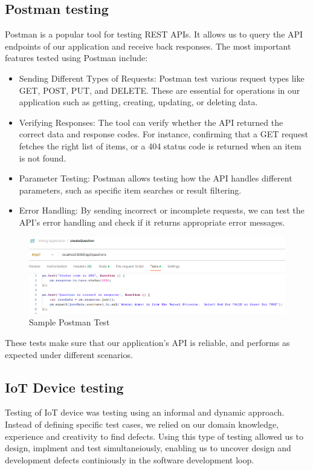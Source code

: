\subsection{Postman testing}
Postman is a popular tool for testing REST APIs. It allows us to query the API endpoints of our application and receive back responses. The most important features tested using Postman include:

\begin{itemize}
    \item {Sending Different Types of Requests}: Postman test various request types like GET, POST, PUT, and DELETE. These are essential for operations in our application such as getting, creating, updating, or deleting data.
    \item {Verifying Responses}: The tool can verify whether the API returned the correct data and response codes. For instance, confirming that a GET request fetches the right list of items, or a 404 status code is returned when an item is not found.
    \item {Parameter Testing}: Postman allows testing how the API handles different parameters, such as specific item searches or result filtering.
    \item {Error Handling}: By sending incorrect or incomplete requests, we can test the API's error handling and check if it returns appropriate error messages.
\end{itemize}

\begin{figure}[h]
  \centering
  \includegraphics[scale=0.65]{figs/create_question_test.png}
  \caption{Sample Postman Test}
  \label{fig:appFlow}
\end{figure}

These tests make sure that our application's API is reliable, and performs as expected under different scenarios.

\subsection{IoT Device testing}

Testing of IoT device was testing using an informal and dynamic approach.  Instead of defining specific test cases, we relied on our domain knowledge, experience and creativity to find defects.  Using this type of testing allowed us to design, implment and test simultaneiously, enabling us to uncover design and development defects continiously in the software development loop. 